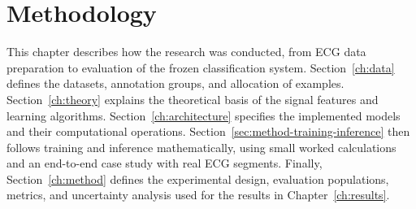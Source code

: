 \chapter{Methodology}\label{ch:methodology}

This chapter describes how the research was conducted, from ECG data preparation
to evaluation of the frozen classification system. Section~\ref{ch:data}
defines the datasets, annotation groups, and allocation of examples.
Section~\ref{ch:theory} explains the theoretical basis of the signal features
and learning algorithms. Section~\ref{ch:architecture} specifies the implemented
models and their computational operations. Section~\ref{sec:method-training-inference}
then follows training and inference mathematically, using small worked
calculations and an end-to-end case study with real ECG segments.
Finally, Section~\ref{ch:method} defines the experimental design, evaluation
populations, metrics, and uncertainty analysis used for the results in
Chapter~\ref{ch:results}.





